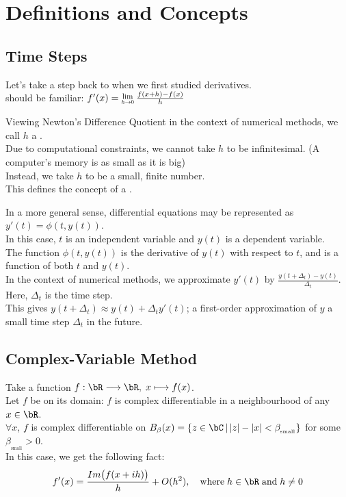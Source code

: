 \section{Definitions and Concepts}

\subsection{Time Steps}
Let's take a step back to when we first studied derivatives.\\
 should be familiar: 
$f'(x) = \Lim{h \to 0} \frac{f(x+h) - f(x)}{h}$

\par Viewing Newton's Difference Quotient in the context of numerical methods, we call $h$ a .\\
Due to computational constraints, we cannot take $h$ to be infinitesimal. (A computer's memory is as small as it is big)\\
Instead, we take $h$ to be a small, finite number.\\
This defines the concept of a .\\

\par In a more general sense, differential equations may be represented as $y'(t) = \phi(t, y(t))$.\\
In this case, $t$ is an independent variable and $y(t)$ is a dependent variable.\\
The function $\phi(t, y(t))$ is the derivative of $y(t)$ with respect to $t$, and is a function of both $t$ and $y(t)$.\\
In the context of numerical methods, we approximate $y'(t)$ by $\frac{y(t+\Delta_t) - y(t)}{\Delta_t}$.\\
Here, $\Delta_t$ is the time step.\\
This gives $y(t + \Delta_t) \approx y(t) + \Delta_t y'(t)$; a first-order approximation of $y$ a small time step $\Delta_t$ in the future.\\

\subsection{Complex-Variable Method}
Take a function $f: \bR \longrightarrow \bR,\; x \longmapsto f(x)$.\\
Let $f$ be  on its domain: $f$ is complex differentiable in a neighbourhood of any $x \in \bR$.\\
$\forall x$, $f$ is complex differentiable on $B_{\beta}(x) = \{z \in \bC \,|\, |z|-|x| < \beta_{_{\text{small}}}\}$ for some $\beta_{_{\text{small}}} > 0$.\\
In this case, we get the following fact:\\
\[f'(x) = \frac{Im\big(f(x+ih)\big)}{h} + O(h^2), \quad \text{where}\; h \in \bR \;\text{and}\; h \neq 0\]\\

